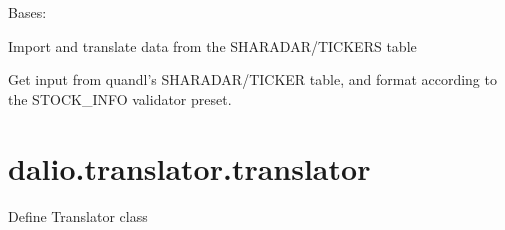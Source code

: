 \documentclass[letterpaper,10pt,english]{sphinxmanual}
\begin{document}

\begin{fulllineitems}
\label{\detokenize{dalio.translator:dalio.translator.quandl.QuandlTickerInfoTranslator}}
Bases: {\hyperref[\detokenize{dalio.translator:dalio.translator.translator.Translator}]{}}

Import and translate data from the SHARADAR/TICKERS table

\begin{fulllineitems}
\label{\detokenize{dalio.translator:dalio.translator.quandl.QuandlTickerInfoTranslator.run}}
Get input from quandl’s SHARADAR/TICKER table, and format
according to the STOCK\_INFO validator preset.

\end{fulllineitems}


\begin{fulllineitems}
\label{\detokenize{dalio.translator:dalio.translator.quandl.QuandlTickerInfoTranslator.translations}}
\end{fulllineitems}


\end{fulllineitems}



\section{dalio.translator.translator}
\label{\detokenize{dalio.translator:module-dalio.translator.translator}}\label{\detokenize{dalio.translator:dalio-translator-translator}}
Define Translator class
\end{document}

